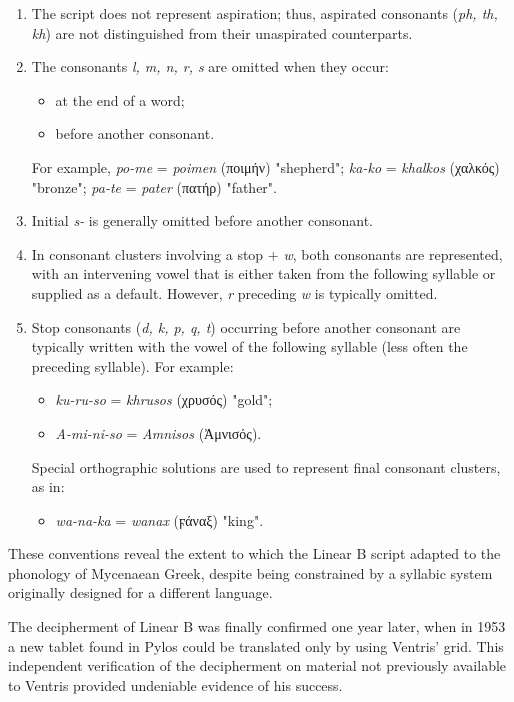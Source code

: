 \begin{enumerate}
\item The script does not represent aspiration; thus, aspirated consonants (\textit{ph, th, kh}) are not distinguished from their unaspirated counterparts.

\item The consonants \textit{l, m, n, r, s} are omitted when they occur:
\begin{itemize}
    \item at the end of a word;
    \item before another consonant.
\end{itemize}
For example, \textit{po-me} = \textit{poimen} (\textgreek{ποιμήν}) "shepherd"; \textit{ka-ko} = \textit{khalkos} (\textgreek{χαλκός}) "bronze"; \textit{pa-te} = \textit{pater} (\textgreek{πατήρ}) "father".

\item Initial \textit{s-} is generally omitted before another consonant.

\item In consonant clusters involving a stop + \textit{w}, both consonants are represented, with an intervening vowel that is either taken from the following syllable or supplied as a default. However, \textit{r} preceding \textit{w} is typically omitted.

\item Stop consonants (\textit{d, k, p, q, t}) occurring before another consonant are typically written with the vowel of the following syllable (less often the preceding syllable). 
For example:
\begin{itemize}
    \item \textit{ku-ru-so} = \textit{khrusos} (\textgreek{χρυσός}) "gold";
    \item \textit{A-mi-ni-so} = \textit{Amnisos} (\textgreek{Ἀμνισός}).
\end{itemize}
Special orthographic solutions are used to represent final consonant clusters, as in:
\begin{itemize}
    \item \textit{wa-na-ka} = \textit{wanax} (\textgreek{ϝάναξ}) "king".
\end{itemize}
\end{enumerate}

These conventions reveal the extent to which the Linear B script adapted to the phonology of Mycenaean Greek, despite being constrained by a syllabic system originally designed for a different language. \cite{chad-ch5}

The decipherment of Linear B was finally confirmed one year later, when in 1953 a new tablet found in Pylos could be translated only by using Ventris' grid.
This independent verification of the decipherment on material not previously available to Ventris provided undeniable evidence of his success. \cite{chad-ch6}


